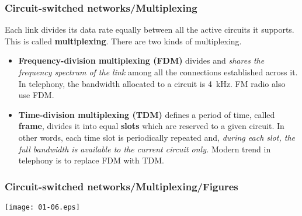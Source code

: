 %
\begin{frame}
\frametitle{Circuit-switched networks/Multiplexing}
\label{fdm_tdm}

Each link divides its data rate equally between all the active
circuits it supports. This is called \textbf{multiplexing}. There are
two kinds of multiplexing.
\begin{itemize}

  \item \textbf{Frequency-division multiplexing (FDM)} divides and
  \emph{shares the frequency spectrum of the link} among all the
  connections established across it. In telephony, the bandwidth
  allocated to a circuit is 4~kHz. FM radio also use FDM.

  \item \textbf{Time-division multiplexing (TDM)} defines a period of
  time, called \textbf{frame}, divides it into equal \textbf{slots}
  which are reserved to a given circuit. In other words, each time
  slot is periodically repeated and, \emph{during each slot, the full
  bandwidth is available to the current circuit only.} Modern trend in
  telephony is to replace FDM with TDM.

\end{itemize}

\end{frame}

%
\begin{frame}
\frametitle{Circuit-switched networks/Multiplexing/Figures}

\begin{center}
\texttt{[image: 01-06.eps]}
\end{center}

\end{frame}

